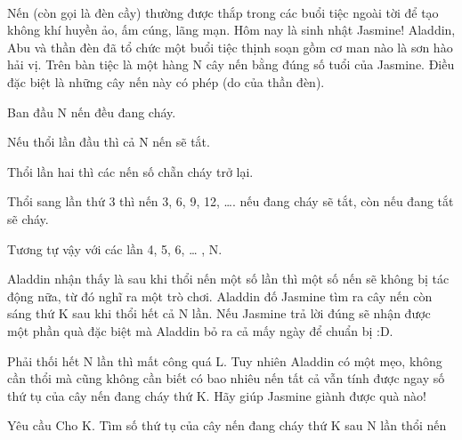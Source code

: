  

Nến (còn gọi là đèn cầy) thường được thắp trong các buổi tiệc ngoài tời để tạo không khí huyền ảo, ấm cúng, lãng mạn. Hôm nay là sinh nhật Jasmine! Aladdin, Abu và thần đèn đã tổ chức một buổi tiệc thịnh soạn gồm cơ man nào là sơn hào hải vị. Trên bàn tiệc là một hàng N cây nến bằng đúng số tuổi của Jasmine. Điều đặc biệt là những cây nến này có phép (do của thần đèn).

Ban đầu N nến đều đang cháy.

Nếu thổi lần đầu thì cả N nến sẽ tắt.

Thổi lần hai thì các nến số chẵn cháy trở lại.

Thổi sang lần thứ 3 thì nến 3, 6, 9, 12, …. nếu đang cháy sẽ tắt, còn nếu đang tắt sẽ cháy.

Tương tự vậy với các lần 4, 5, 6, … , N.

Aladdin nhận thấy là sau khi thổi nến một số lần thì một số nến sẽ không bị tác động nữa, từ đó nghĩ ra một trò chơi. Aladdin đố Jasmine tìm ra cây nến còn sáng thứ K sau khi thổi hết cả N lần. Nếu Jasmine trả lời đúng sẽ nhận được một phần quà đặc biệt mà Aladdin bỏ ra cả mấy ngày để chuẩn bị :D.

Phải thối hết N lần thì mất công quá L. Tuy nhiên Aladdin có một mẹo, không cần thổi mà cũng không cần biết có bao nhiêu nến tất cả vẫn tính được ngay số thứ tụ của cây nến đang cháy thứ K. Hãy giúp Jasmine giành được quà nào!

Yêu cầu
Cho K. Tìm số thứ tụ của cây nến đang cháy thứ K sau N lần thổi nến